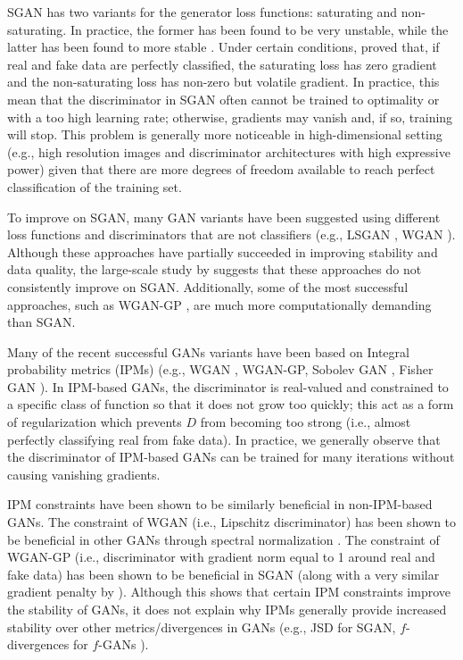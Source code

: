 \documentclass{article}
\begin{document}
SGAN has two variants for the generator loss functions: saturating and non-saturating. In practice, the former has been found to be very unstable, while the latter has been found to more stable \citep{GAN}. Under certain conditions, \citet{GANTheorems} proved that, if real and fake data are perfectly classified, the saturating loss has zero gradient and the non-saturating loss has non-zero but volatile gradient. In practice, this mean that the discriminator in SGAN often cannot be trained to optimality or with a too high learning rate; otherwise, gradients may vanish and, if so, training will stop. This problem is generally more noticeable in high-dimensional setting (e.g., high resolution images and discriminator architectures with high expressive power) given that there are more degrees of freedom available to reach perfect classification of the training set.

To improve on SGAN, many GAN variants have been suggested using different loss functions and discriminators that are not classifiers (e.g., LSGAN \citep{LSGAN}, WGAN \citep{WGAN}). Although these approaches have partially succeeded in improving stability and data quality, the large-scale study by \citet{lucic2017gans} suggests that these approaches do not consistently improve on SGAN. Additionally, some of the most successful approaches, such as WGAN-GP \citep{WGAN-GP}, are much more computationally demanding than SGAN.

Many of the recent successful GANs variants have been based on Integral probability metrics (IPMs) \citep{muller1997integral} (e.g., WGAN \citep{WGAN}, WGAN-GP\citep{WGAN-GP}, Sobolev GAN \citep{mroueh2017sobolev}, Fisher GAN \citep{Fisher}). In IPM-based GANs, the discriminator is real-valued and constrained to a specific class of function so that it does not grow too quickly; this act as a form of regularization which prevents $D$ from becoming too strong (i.e., almost perfectly classifying real from fake data). In practice, we generally observe that the discriminator of IPM-based GANs can be trained for many iterations without causing vanishing gradients. 
 
IPM constraints have been shown to be similarly beneficial in non-IPM-based GANs. The constraint of WGAN (i.e., Lipschitz discriminator) has been shown to be beneficial in other GANs through spectral normalization \citep{miyato2018spectral}. The constraint of WGAN-GP (i.e., discriminator with gradient norm equal to 1 around real and fake data) has been shown to be beneficial in SGAN \citep{ManyPaths} (along with a very similar gradient penalty by \cite{DRAGAN}). Although this shows that certain IPM constraints improve the stability of GANs, it does not explain why IPMs generally provide increased stability over other metrics/divergences in GANs (e.g., JSD for SGAN, $f$-divergences for $f$-GANs \citep{F-GAN}).
\end{document}
